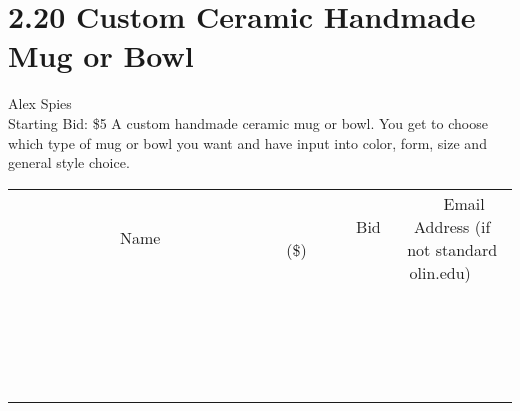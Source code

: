 \documentclass[11pt]{article}
\begin{document}
\section*{2.20 Custom Ceramic Handmade Mug or Bowl}
Alex Spies
\\
Starting Bid: \$5
\newline
A custom handmade ceramic mug or bowl. You get to choose which type of mug or bowl you want and have input into color, form, size and general style choice.
\\[3ex]
\begin{tabular}{c c c}
~~~~~~~~~~~~~Name~~~~~~~~~~~~~ & ~~~~~~~~~Bid (\$)~~~~~~~~~  & ~~~Email Address (if not standard olin.edu)~~~\\
 & & \\
\hline
 & & \\
\hline
 & & \\
\hline
 & & \\
\hline
 & & \\
\hline
 & & \\
\hline
 & & \\
\hline
 & & \\
\hline
 & & \\
\hline
 & & \\
\hline
 & & \\
\hline
 & & \\
\hline
 & & \\
\hline
 & & \\
\hline
 & & \\
\hline
 & & \\
\hline
 & & \\
\hline
 & & \\
\hline
 & & \\
\hline
\end{tabular}
\newpage
\end{document}
